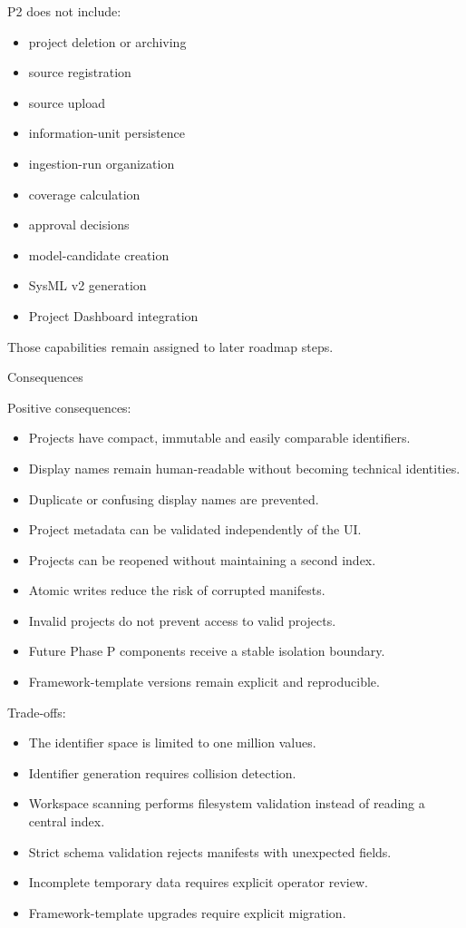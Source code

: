 P2 does not include:

\begin{itemize}
\tightlist
\item
  project deletion or archiving
\item
  source registration
\item
  source upload
\item
  information-unit persistence
\item
  ingestion-run organization
\item
  coverage calculation
\item
  approval decisions
\item
  model-candidate creation
\item
  SysML v2 generation
\item
  Project Dashboard integration
\end{itemize}

Those capabilities remain assigned to later roadmap steps.

Consequences

Positive consequences:

\begin{itemize}
\tightlist
\item
  Projects have compact, immutable and easily comparable identifiers.
\item
  Display names remain human-readable without becoming technical identities.
\item
  Duplicate or confusing display names are prevented.
\item
  Project metadata can be validated independently of the UI.
\item
  Projects can be reopened without maintaining a second index.
\item
  Atomic writes reduce the risk of corrupted manifests.
\item
  Invalid projects do not prevent access to valid projects.
\item
  Future Phase P components receive a stable isolation boundary.
\item
  Framework-template versions remain explicit and reproducible.
\end{itemize}

Trade-offs:

\begin{itemize}
\tightlist
\item
  The identifier space is limited to one million values.
\item
  Identifier generation requires collision detection.
\item
  Workspace scanning performs filesystem validation instead of reading a central index.
\item
  Strict schema validation rejects manifests with unexpected fields.
\item
  Incomplete temporary data requires explicit operator review.
\item
  Framework-template upgrades require explicit migration.
\end{itemize}

